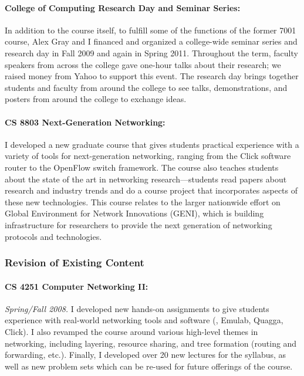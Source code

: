 \paragraph{College of Computing Research Day and Seminar Series:}
In addition to the course itself, to fulfill some of the functions of
the former 7001 course, Alex Gray and I financed and organized a
college-wide seminar series and research day in Fall 2009 and again in
Spring 2011.  Throughout the term, faculty speakers from across the
college gave one-hour talks about their research; we raised money from
Yahoo to support this event.  The research day brings together students
and faculty from around the college to see talks, demonstrations, and
posters from around the college to exchange ideas.

\paragraph{CS 8803 Next-Generation Networking:} I developed a
new graduate course that gives students practical experience with
a variety of tools for next-generation networking, ranging from the
Click software router to the OpenFlow switch framework.  The course also
teaches students about the state of the art in networking
research---students read papers about research and industry trends and
do a course project that incorporates aspects of these new
technologies.  This course relates to the larger nationwide effort on
Global Environment for Network Innovations (GENI), which is building
infrastructure for researchers to provide the next generation of
networking protocols and technologies.

\subsubsection{Revision of Existing Content}

\paragraph{CS 4251 Computer Networking II:}
{\em Spring/Fall 2008.} I developed new hands-on assignments to give
students experience with real-world networking tools and software (\eg,
Emulab, Quagga, Click).  I also revamped the course around various
high-level themes in networking, including layering, resource sharing,
and tree formation (routing and forwarding, etc.).  Finally, I developed over
20 new lectures for the syllabus, as well as new problem sets which can
be re-used for future offerings of the course.

